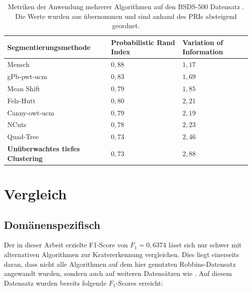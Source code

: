 \begin{table}[h!]
	\begin{tabularx}{\textwidth}{p{} >{\centering} p{} >{\centering\arraybackslash} p{}}
		\toprule
		\textbf{Segmentierungsmethode} & \textbf{Probabilistic Rand Index} & \textbf{Variation of Information} \\
		\midrule
		Mensch \cite{bsd500} & $0,88$ & $1,17$ \\
		\midrule
		gPb-pwt-ucm \cite{arbelaez_10} & $0,83$ & $1,69$ \\
		Mean Shift \cite{comaniciu_02} & $0,79$ & $1,85$ \\
		Felz-Hutt \cite{felzenszwalb_04} & $0,80$ & $2,21$ \\
		Canny-owt-ucm \cite{arbelaez_10} & $0,79$ & $2,19$ \\
		NCuts \cite{cour_05} & $0,78$ & $2,23$ \\
		Quad-Tree & $0,73$ & $2,46$ \\
		\textbf{Unüberwachtes tiefes Clustering} & $0,73$ & $2,88$ \\
		\bottomrule
	\end{tabularx}
	\caption{Metriken der Anwendung mehrerer Algorithmen auf den BSDS-500 Datensatz \cite{bsd500}. Die Werte wurden aus \cite{arbelaez_10} übernommen und sind anhand des PRIs absteigend geordnet.}
	\label{tab:res_bsds500}
\end{table}


\section{Vergleich}
\label{sec:comparision}

\subsection{Domänenspezifisch}

Der in dieser Arbeit erzielte F1-Score von $F_1=0,6374$ lässt sich nur schwer mit alternativen Algorithmen zur Kratererkennung vergleichen. Dies liegt einerseits daran, dass nicht alle Algorithmen auf dem hier genutzten Robbins-Datensatz \cite{robbins_12} angewandt wurden, sondern auch auf weiteren Datensätzen wie \cite{bandeira_10}. Auf diesem Datensatz wurden bereits folgende $F_1$-Scores erreicht:

